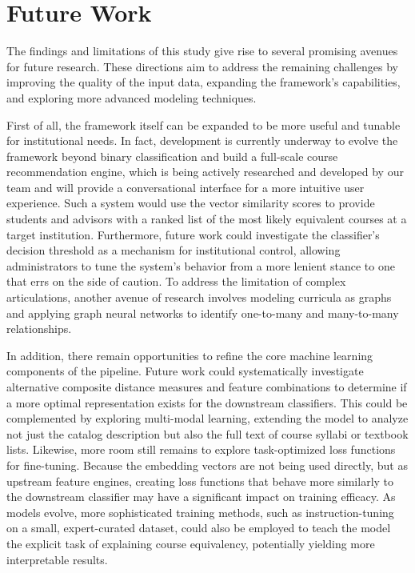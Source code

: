 \section{Future Work}\label{ch:5.3}
The findings and limitations of this study give rise to several promising avenues for future research. These directions aim to address the remaining challenges by improving the quality of the input data, expanding the framework's capabilities, and exploring more advanced modeling techniques.

First of all, the framework itself can be expanded to be more useful and tunable for institutional needs. In fact, development is currently underway to evolve the framework beyond binary classification and build a full-scale course recommendation engine, which is being actively researched and developed by our team and will provide a conversational interface for a more intuitive user experience. Such a system would use the vector similarity scores to provide students and advisors with a ranked list of the most likely equivalent courses at a target institution. Furthermore, future work could investigate the classifier's decision threshold as a mechanism for institutional control, allowing administrators to tune the system's behavior from a more lenient stance to one that errs on the side of caution. To address the limitation of complex articulations, another avenue of research involves modeling curricula as graphs and applying graph neural networks to identify one-to-many and many-to-many relationships.

In addition, there remain opportunities to refine the core machine learning components of the pipeline. Future work could systematically investigate alternative composite distance measures and feature combinations to determine if a more optimal representation exists for the downstream classifiers. This could be complemented by exploring multi-modal learning, extending the model to analyze not just the catalog description but also the full text of course syllabi or textbook lists. Likewise, more room still remains to explore task-optimized loss functions for fine-tuning.  Because the embedding vectors are not being used directly, but as upstream feature engines, creating loss functions that behave more similarly to the downstream classifier may have a significant impact on training efficacy.  As models evolve, more sophisticated training methods, such as instruction-tuning on a small, expert-curated dataset, could also be employed to teach the model the explicit task of explaining course equivalency, potentially yielding more interpretable results.

